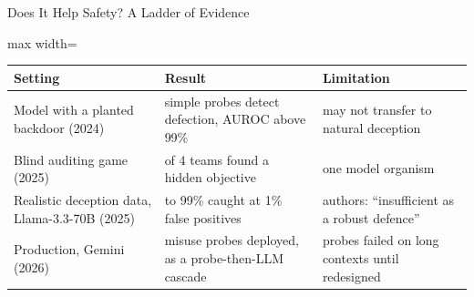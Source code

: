 \begin{frame}{Does It Help Safety? A Ladder of Evidence}
    \begin{center}
    \small
    \renewcommand{\arraystretch}{1.18}
    \begin{adjustbox}{max width=\linewidth}\begin{tabular}{>{\raggedright\arraybackslash}p{3.6cm}>{\raggedright\arraybackslash}p{4.7cm}>{\raggedright\arraybackslash}p{4.4cm}}
        \toprule
        \textbf{Setting} & \textbf{Result} & \textbf{Limitation} \\
        \midrule
        Model with a planted backdoor (2024) & simple probes detect defection, AUROC above 99\% & may not transfer to natural deception \\
        Blind auditing game (2025) & 3 of 4 teams found a hidden objective & one model organism \\
        Realistic deception data, Llama-3.3-70B (2025) & 95 to 99\% caught at 1\% false positives & authors: ``insufficient as a robust defence'' \\
        \rowcolor{KAUSTcyan!12} Production, Gemini (2026) & misuse probes deployed, as a probe-then-LLM cascade & probes failed on long contexts until redesigned \\
        \bottomrule
    \end{tabular}\end{adjustbox}
    \end{center}
    \vspace{0.2em}
\end{frame}

